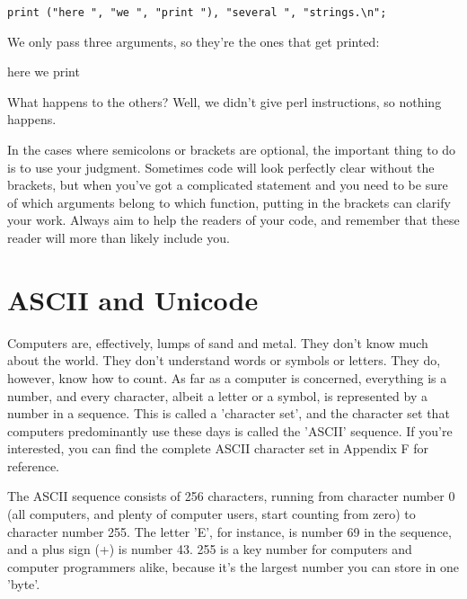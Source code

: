 \documentclass[a4paper,12pt,twoside]{book}
\begin{document}
\noindent 

\noindent \texttt{print ("here ", "we ", "print "), "several ", "strings.\textbackslash n";}

\noindent 

\noindent We only pass three arguments, so they're the ones that get printed:

\noindent 

\noindent here we print

\noindent 

\noindent What happens to the others? Well, we didn't give perl instructions, so nothing happens.

\noindent 

\noindent In the cases where semicolons or brackets are optional, the important thing to do is to use your judgment. Sometimes code will look perfectly clear without the brackets, but when you've got a complicated statement and you need to be sure of which arguments belong to which function, putting in the brackets can clarify your work. Always aim to help the readers of your code, and remember that these reader will more than likely include you.

\noindent 

\section{ASCII and Unicode}

\noindent 

\noindent Computers are, effectively, lumps of sand and metal. They don't know much about the world. They don't understand words or symbols or letters. They do, however, know how to count. As far as a computer is concerned, everything is a number, and every character, albeit a letter or a symbol, is represented by a number in a sequence. This is called a 'character set', and the character set that computers predominantly use these days is called the 'ASCII' sequence. If you're interested, you can find the complete ASCII character set in Appendix F for reference.

\noindent 

\noindent The ASCII sequence consists of 256 characters, running from character number 0 (all computers, and plenty of computer users, start counting from zero) to character number 255. The letter 'E', for instance, is number 69 in the sequence, and a plus sign (+) is number 43. 255 is a key number for computers and computer programmers alike, because it's the largest number you can store in one 'byte'.
\end{document}
